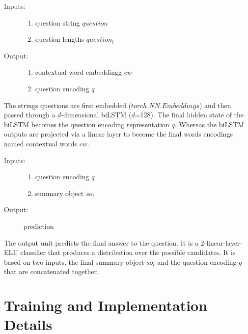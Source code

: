 \begin{description}
	\item[Inputs:] 
	\begin{enumerate}
		\item question string $question$
		\item question lengths $question_l$
		
	\end{enumerate}
	
	
	\item[Output:] 
	\begin{enumerate}
		\item contextual word embeddingg $cw$
		\item question encoding $q$
		
	\end{enumerate}
	
\end{description}



The strings questions are first embedded ($torch.NN.Embeddings$) and then passed through a $d$-dimensional biLSTM ($d$=128).
The final hidden state of the biLSTM becomes the question encoding representation $q$. Whereas the biLSTM outputs are projected via a linear layer to become the final words encodings named contextual words $cw$. 


\begin{description}
	\item[Inputs:] 
	\begin{enumerate}
		\item question encoding $q$
		\item summary object $so_t$

	\end{enumerate}
	
	
	\item[Output:] 
	prediction 
\end{description}



The output unit predicts the final answer to the question. It is a 2-linear-layer-ELU classifier that produces a distribution over the possible candidates. It is based on two inputs, the final summary object $so_t$ and the question encoding $q$ that are concatenated together. 
 

\section{Training and Implementation Details}


